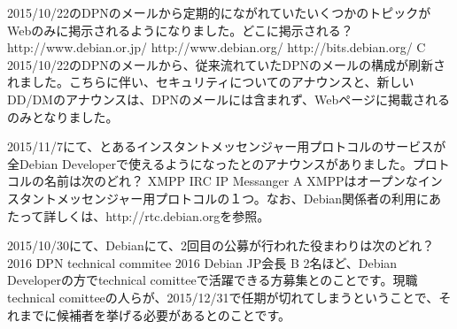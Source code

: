 %

\santaku
{2015/10/22のDPNのメールから定期的にながれていたいくつかのトピックがWebのみに掲示されるようになりました。どこに掲示される？}
{http://www.debian.or.jp/}
{http://www.debian.org/}
{http://bits.debian.org/}
{C}
{2015/10/22のDPNのメールから、従来流れていたDPNのメールの構成が刷新されました。こちらに伴い、セキュリティについてのアナウンスと、新しいDD/DMのアナウンスは、DPNのメールには含まれず、Webページに掲載されるのみとなりました。}

\santaku
{2015/11/7にて、とあるインスタントメッセンジャー用プロトコルのサービスが全Debian Developerで使えるようになったとのアナウンスがありました。プロトコルの名前は次のどれ？}
{XMPP}
{IRC}
{IP Messanger}
{A}
{XMPPはオープンなインスタントメッセンジャー用プロトコルの１つ。なお、Debian関係者の利用にあたって詳しくは、http://rtc.debian.orgを参照。}

\santaku
{2015/10/30にて、Debianにて、2回目の公募が行われた役まわりは次のどれ？}
{2016 DPN}
{technical commitee}
{2016 Debian JP会長}
{B}
{2名ほど、Debian Developerの方でtechnical comitteeで活躍できる方募集とのことです。現職technical comitteeの人らが、2015/12/31で任期が切れてしまうということで、それまでに候補者を挙げる必要があるとのことです。}


